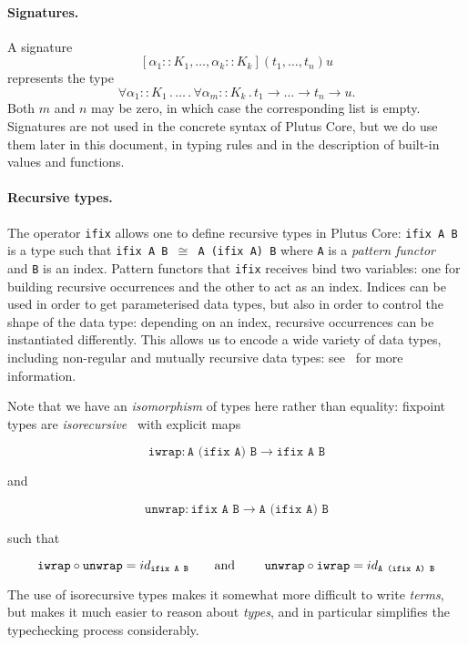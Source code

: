 \documentclass[a4paper]{article}
\begin{document}
\paragraph{Signatures.}  A signature
$$[\alpha_1::K_1, \ldots, \alpha_k::K_k](t_1, \ldots, t_n)u$$ represents
the type
$$\forall \alpha_1::K_1\,.\, \ldots \,.\, \forall \alpha_m::K_k\,.\, t_1
\rightarrow \ldots \rightarrow t_n \rightarrow u.$$
Both $m$ and $n$
may be zero, in which case the corresponding list is empty.
Signatures are not used in the concrete syntax of Plutus Core, but we
do use them later in this document, in typing rules and in the
description of built-in values and functions.

\paragraph{Recursive types.}
\label{sec:ifix-note}
\noindent
The operator \texttt{ifix} allows one to define recursive types in
Plutus Core: \texttt{ifix A B} is a type such that \texttt{ifix A B
  $\cong$ A (ifix A) B} where \texttt{A} is a \textit{pattern
  functor}~\citep[2.4]{backhouseetal98} and \texttt{B} is an
index. Pattern functors that \texttt{ifix} receives bind two
variables: one for building recursive occurrences and the other to act
as an index. Indices can be used in order to get parameterised data
types, but also in order to control the shape of the data type:
depending on an index, recursive occurrences can be instantiated
differently.  This allows us to encode a wide variety of data types,
including non-regular and mutually recursive data types:
see~\citep[3.1]{unravelling-recursion} for more information.

Note that we have an \textit{isomorphism} of types here rather than
equality: fixpoint types are
\textit{isorecursive}~\citep[20.2]{Pierce:TAPL} with explicit maps

$$
\texttt{iwrap} : \texttt{A (ifix A) B} \rightarrow \texttt{ifix A B}
$$

\noindent and

$$
\texttt{unwrap} : \texttt{ifix A B} \rightarrow  \texttt{A (ifix A) B}
$$

\noindent such that

$$
\texttt{iwrap} \circ \texttt{unwrap} = id_{ \texttt{ifix A B}}
\mbox{\qquad and \qquad}
\texttt{unwrap} \circ \texttt{iwrap} = id_{ \texttt{A (ifix A) B}}
$$

\noindent The use of isorecursive types makes it somewhat more difficult to
write \textit{terms}, but makes it much easier to reason about
\textit{types}, and in particular simplifies the typechecking process
considerably.
\end{document}
